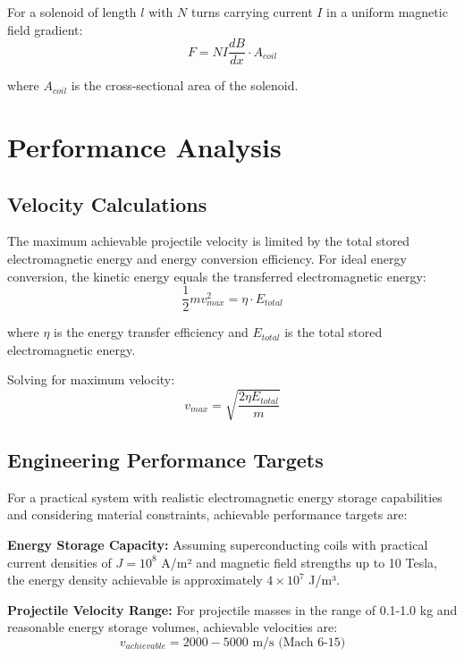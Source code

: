 \documentclass[12pt,a4paper]{article}
\begin{document}
For a solenoid of length $l$ with $N$ turns carrying current $I$ in a uniform magnetic field gradient:
\begin{equation}
F = N I \frac{dB}{dx} \cdot A_{coil}
\end{equation}

where $A_{coil}$ is the cross-sectional area of the solenoid.

\section{Performance Analysis}

\subsection{Velocity Calculations}

The maximum achievable projectile velocity is limited by the total stored electromagnetic energy and energy conversion efficiency. For ideal energy conversion, the kinetic energy equals the transferred electromagnetic energy:
\begin{equation}
\frac{1}{2}mv_{max}^2 = \eta \cdot E_{total}
\end{equation}

where $\eta$ is the energy transfer efficiency and $E_{total}$ is the total stored electromagnetic energy.

Solving for maximum velocity:
\begin{equation}
v_{max} = \sqrt{\frac{2\eta E_{total}}{m}}
\end{equation}

\subsection{Engineering Performance Targets}

For a practical system with realistic electromagnetic energy storage capabilities and considering material constraints, achievable performance targets are:

\textbf{Energy Storage Capacity:}
Assuming superconducting coils with practical current densities of $J = 10^8$ A/m² and magnetic field strengths up to 10 Tesla, the energy density achievable is approximately $4 \times 10^7$ J/m³.

\textbf{Projectile Velocity Range:}
For projectile masses in the range of 0.1-1.0 kg and reasonable energy storage volumes, achievable velocities are:
\begin{equation}
v_{achievable} = 2000 - 5000 \text{ m/s} \text{ (Mach 6-15)}
\end{equation}
\end{document}
